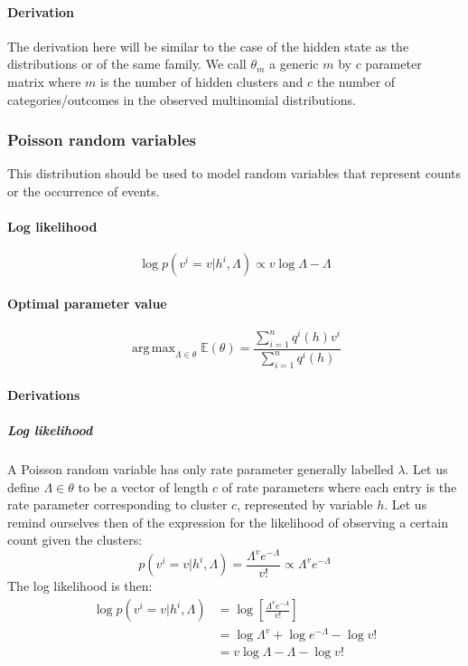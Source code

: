 \documentclass[]{article}
\DeclareMathOperator*{\argmax}{arg\,max}
\begin{document}
\paragraph{Derivation}

The derivation here will be similar to the case of the hidden state as the distributions or of the same family. We call $\theta_m$ a generic $m$ by $c$ parameter matrix where $m$ is the number of hidden clusters and $c$ the number of categories/outcomes in the observed multinomial distributions.


\subsubsection{Poisson random variables}

This distribution should be used to model random variables that represent counts or the occurrence of events.

\paragraph{Log likelihood}
\[
\log p(v^i=v|h^i, \Lambda) \propto v \log \Lambda - \Lambda
\]
\paragraph{Optimal parameter value}
\[
\argmax_{\Lambda \in \theta} \mathbb{E}(\theta) =  \frac{\sum_{i=1}^{n} q^i(h) v^i}{\sum_{i=1}^{n} q^i(h)}
\]

\paragraph{Derivations}

\subparagraph{Log likelihood}

A Poisson random variable has only rate parameter generally labelled $\lambda$. Let us define $\Lambda \in \theta$ to be a vector of length $c$ of rate parameters where each entry is the rate parameter corresponding to cluster $c$, represented by variable $h$. Let us remind ourselves then of the expression for the likelihood of observing a certain count given the clusters:
\[
p(v^i=v|h^i, \Lambda) = \frac{\Lambda^v e^{-\Lambda}}{v!} \propto \Lambda^v e^{-\Lambda}
\]
The log likelihood is then:
\begin{align*}
	\log p(v^i=v|h^i, \Lambda) &= \log \left[ \frac{\Lambda^v e^{-\Lambda}}{v!} \right] \\
	&= \log \Lambda^v + \log e^{-\Lambda} - \log v!\\
	&= v \log \Lambda - \Lambda - \log v!
\end{align*}
\end{document}

